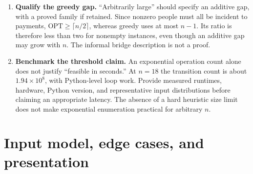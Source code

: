 \documentclass[11pt]{article}
\begin{document}
\begin{enumerate}
\item \textbf{Qualify the greedy gap.} ``Arbitrarily large'' should specify
an additive gap, with a proved family if retained. Since nonzero people
must all be incident to payments, $\mathrm{OPT}\geq\lceil n/2\rceil$,
whereas greedy uses at most $n-1$. Its ratio is therefore less than two
for nonempty instances, even though an additive gap may grow with $n$.
The informal bridge description is not a proof.

\item \textbf{Benchmark the threshold claim.} An exponential operation
count alone does not justify ``feasible in seconds.'' At $n=18$ the
transition count is about $1.94\times10^8$, with Python-level loop work.
Provide measured runtimes, hardware, Python version, and representative
input distributions before claiming an appropriate latency. The absence
of a hard heuristic size limit does not make exponential enumeration
practical for arbitrary $n$.
\end{enumerate}

\section{Input model, edge cases, and presentation}
\end{document}
